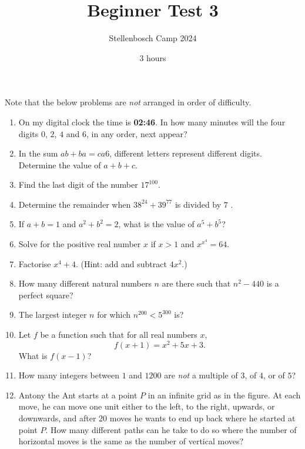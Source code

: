 \documentclass[12pt]{article}
\title{Beginner Test 3}
\author{Stellenbosch Camp 2024}
\date{$3$ hours}
\begin{document}
 \maketitle

Note that the below problems are \emph{not} arranged in order of difficulty.

\begin{enumerate}[topsep=2\bigskipamount,itemsep=\bigskipamount]

\item On my digital clock the time is {\bf 02:46}.
In how many minutes will the four digits $0$, $2$, $4$ and $6$, in any order, next appear? 

\item In the sum $ab + ba = ca6$, different letters represent different digits.
Determine the value of $a+b+c$.

\item Find the last digit of the number $17^{100}$.

\item Determine the remainder when $38^{24}+39^{77}$ is divided by $7$ .


\item If $a+b = 1$ and $a^2+b^2 = 2$, what is the value of $a^5+b^5$?

\item Solve for the positive real number $x$ if $x>1$ and $x^{x^4} = 64$.

\item Factorise $x^4 +4$. (Hint: add and subtract $4x^2$.)


\item How many different natural numbers $n$ are there such that $n^{2}-440$ is a perfect square?

\item The largest integer $n$ for which $n^{200} < 5^{300}$ is?

\item Let $f$ be a function such that for all real numbers $x$,
\[ f(x+1) = x^{2}+5x+3. \]
What is $f(x-1)$?


\item How many integers between $1$ and $1200$ are \emph{not} a multiple of $3$, of $4$, or of $5$?

\pagebreak
\item
\begin{multicols}{2}
    Antony the Ant starts at a point $P$ in an infinite grid as in the figure.
    At each move, he can move one unit either to the left, to the right, upwards, or downwards, and after $20$ moves he wants to end up back where he started at point $P$.
    How many different paths can he take to do so where the number of horizontal moves is the same as the number of vertical moves?


\end{multicols}
\end{enumerate}
\end{document}
